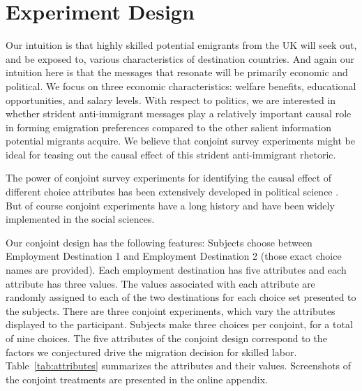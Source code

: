 \documentclass[12pt]{article}
\begin{document}



\section*{Experiment Design}

\par Our intuition is that highly skilled potential emigrants from the UK will seek out, and be exposed to, various characteristics of destination countries. And again our intuition here is that the messages that resonate will be primarily economic and political. We focus on three economic characteristics: welfare benefits, educational opportunities, and salary levels. With respect to politics, we are interested in whether strident anti-immigrant messages play a relatively important causal role in forming emigration preferences compared to the other salient information potential migrants acquire. We believe that conjoint survey experiments might be ideal for teasing out the causal effect of this strident anti-immigrant rhetoric.  
\par The power of conjoint survey experiments for identifying the causal effect of different choice attributes has been extensively developed in political science \citep{Hainmuelleretal2013,Hainmuelleretal2015}. But of course conjoint experiments have a long history and have been widely implemented in the social sciences.   

\par Our conjoint design has the following features: Subjects choose between Employment Destination 1 and Employment Destination 2 (those exact choice names are provided). Each employment destination has five attributes and each attribute has three values. The values associated with each attribute are randomly assigned to each of the two destinations for each choice set presented to the subjects. There are three conjoint experiments, which vary the attributes displayed to the participant. Subjects make three choices per conjoint, for a total of nine choices. The five attributes of the conjoint design correspond to the factors we conjectured drive the migration decision for skilled labor. Table~\ref{tab:attributes} summarizes the attributes and their values. Screenshots of the conjoint treatments are presented in the online appendix.
\end{document}
